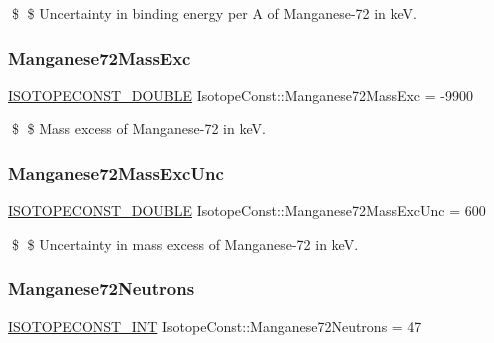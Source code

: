 \$ \$ Uncertainty in binding energy per A of Manganese-\/72 in keV. \mbox{\label{group___isotope_const-_manganese-_mn72_ga3e0d733f6a6243f8ca2ef3ab595a2cff}} 
\subsubsection{\texorpdfstring{Manganese72\+Mass\+Exc}{Manganese72MassExc}}
{\footnotesize\ttfamily \mbox{\hyperlink{group___isotope_const-_macros_ga8f45a7272ce02c0b4c65c44636ed719a}{I\+S\+O\+T\+O\+P\+E\+C\+O\+N\+S\+T\+\_\+\+D\+O\+U\+B\+LE}} Isotope\+Const\+::\+Manganese72\+Mass\+Exc = -\/9900}

\$ \$ Mass excess of Manganese-\/72 in keV. \mbox{\label{group___isotope_const-_manganese-_mn72_gadd4fc7dafa163a63ed595969a5f406d1}} 
\subsubsection{\texorpdfstring{Manganese72\+Mass\+Exc\+Unc}{Manganese72MassExcUnc}}
{\footnotesize\ttfamily \mbox{\hyperlink{group___isotope_const-_macros_ga8f45a7272ce02c0b4c65c44636ed719a}{I\+S\+O\+T\+O\+P\+E\+C\+O\+N\+S\+T\+\_\+\+D\+O\+U\+B\+LE}} Isotope\+Const\+::\+Manganese72\+Mass\+Exc\+Unc = 600}

\$ \$ Uncertainty in mass excess of Manganese-\/72 in keV. \mbox{\label{group___isotope_const-_manganese-_mn72_ga31aaeadc618353579cc2f4ed4ca84b0f}} 
\subsubsection{\texorpdfstring{Manganese72\+Neutrons}{Manganese72Neutrons}}
{\footnotesize\ttfamily \mbox{\hyperlink{group___isotope_const-_macros_ga5f18360b3e99483a35c32d789e62621c}{I\+S\+O\+T\+O\+P\+E\+C\+O\+N\+S\+T\+\_\+\+I\+NT}} Isotope\+Const\+::\+Manganese72\+Neutrons = 47}

